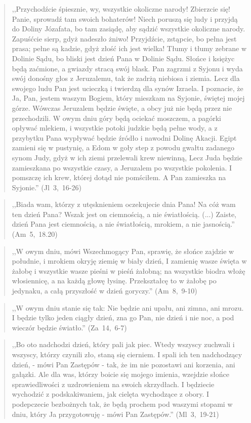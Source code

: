\documentclass[10pt,a4paper,oneside]{article}
\begin{document}
\begin{quote}
,,Przychodźcie śpiesznie, wy, wszystkie okoliczne narody! Zbierzcie się! Panie, sprowadź tam swoich bohaterów! Niech poruszą się ludy i przyjdą do Doliny Józafata, bo tam zasiądę, aby sądzić wszystkie okoliczne narody. Zapuśćcie sierp, gdyż nadeszło żniwo! Przyjdźcie, zstąpcie, bo pełna jest prasa; pełne są kadzie, gdyż złość ich jest wielka! Tłumy i tłumy zebrane w Dolinie Sądu, bo bliski jest dzień Pana w Dolinie Sądu. Słońce i księżyc będą zaćmione, a gwiazdy stracą swój blask. Pan zagrzmi z Syjonu i wyda swój donośny głos z Jeruzalemu, tak że zadrżą niebiosa i ziemia. Lecz dla swojego ludu Pan jest ucieczką i twierdzą dla synów Izraela. I poznacie, że Ja, Pan, jestem waszym Bogiem, który mieszkam na Syjonie, świętej mojej górze. Wówczas Jeruzalem będzie święte, a obcy już nie będą przez nie przechodzili. W owym dniu góry będą ociekać moszczem, a pagórki opływać mlekiem, i wszystkie potoki judzkie będą pełne wody, a z przybytku Pana wypływać będzie źródło i nawodni Dolinę Akacji. Egipt zamieni się w pustynię, a Edom w goły step z powodu gwałtu zadanego synom Judy, gdyż w ich ziemi przelewali krew niewinną, Lecz Juda będzie zamieszkana po wszystkie czasy, a Jeruzalem po wszystkie pokolenia. I pomszczę ich krew, której dotąd nie pomściłem. A Pan zamieszka na Syjonie.'' (Jl~3,~16-26)
\end{quote}
\begin{quote}
,,Biada wam, którzy z utęsknieniem oczekujecie dnia Pana! Na cóż wam ten dzień Pana? Wszak jest on ciemnością, a nie światłością. (...) Zaiste, dzień Pana jest ciemnością, a nie światłością, mrokiem, a nie jasnością.'' (Am~5,~18.20)
\end{quote}
\begin{quote}
,,W owym dniu, mówi Wszechmogący Pan, sprawię, że słońce zajdzie w południe, i mrokiem okryję ziemię w biały dzień, I zamienię wasze święta w żałobę i wszystkie wasze pieśni w pieśń żałobną; na wszystkie biodra włożę włosiennicę, a na każdą głowę łysinę. Przekształcę to w żałobę po jedynaku, a całą przyszłość w dzień goryczy.'' (Am~8,~9-10)
\end{quote}
\begin{quote}
,,W owym dniu stanie się tak: Nie będzie ani upału, ani zimna, ani mrozu. I będzie tylko jeden ciągły dzień, zna go Pan, nie dzień i nie noc, a pod wieczór będzie światło.'' (Za~14,~6-7)
\end{quote}
\begin{quote}
,,Bo oto nadchodzi dzień, który pali jak piec. Wtedy wszyscy zuchwali i wszyscy, którzy czynili zło, staną się cierniem. I spali ich ten nadchodzący dzień, - mówi Pan Zastępów - tak, że im nie pozostawi ani korzenia, ani gałązki. Ale dla was, którzy boicie się mojego imienia, wzejdzie słońce sprawiedliwości z uzdrowieniem na swoich skrzydłach. I będziecie wychodzić z podskakiwaniem, jak cielęta wychodzące z obory. I podepczecie bezbożnych tak, że będą prochem pod waszymi stopami w dniu, który Ja przygotowuję - mówi Pan Zastępów.'' (Ml~3,~19-21)
\end{quote}
\end{document}
